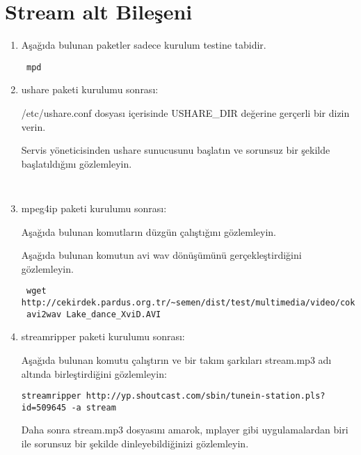 \documentclass[a4paper,10pt]{article}
\begin{document}
\section{Stream alt Bileşeni}
\begin{enumerate}

\item Aşağıda bulunan paketler sadece kurulum testine tabidir.
\begin{verbatim}
 mpd
\end{verbatim}

\item ushare paketi kurulumu sonrası:

/etc/ushare.conf dosyası içerisinde USHARE\_DIR değerine gerçerli bir dizin verin.

Servis yöneticisinden ushare sunucusunu başlatın ve sorunsuz bir şekilde başlatıldığını gözlemleyin.

\begin{verbatim}
 
\end{verbatim}

\item mpeg4ip paketi kurulumu sonrası:

Aşağıda bulunan komutların düzgün çalıştığını gözlemleyin.

Aşağıda bulunan komutun avi wav dönüşümünü gerçekleştirdiğini gözlemleyin.
\begin{verbatim}
 wget http://cekirdek.pardus.org.tr/~semen/dist/test/multimedia/video/cokluortam/Lake_dance_XviD.AVI
 avi2wav Lake_dance_XviD.AVI
\end{verbatim}

\item streamripper paketi kurulumu sonrası:

Aşağıda bulunan komutu çalıştırın ve bir takım şarkıları stream.mp3 adı altında birleştirdiğini gözlemleyin:
\begin{verbatim}
streamripper http://yp.shoutcast.com/sbin/tunein-station.pls?id=509645 -a stream 
\end{verbatim}

Daha sonra stream.mp3 dosyasını amarok, mplayer gibi uygulamalardan biri ile sorunsuz bir şekilde dinleyebildiğinizi gözlemleyin.

\end{enumerate}
\end{document}
